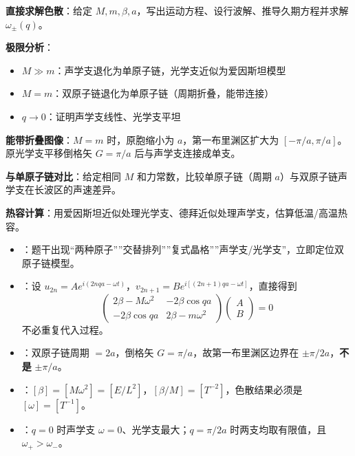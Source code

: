 \begin{drillbox}[训练点与考法变体]
 \textbf{直接求解色散}：给定 $M, m, \beta, a$，写出运动方程、设行波解、推导久期方程并求解 $\omega_{\pm}(q)$。

 \textbf{极限分析}：
\begin{itemize}[nosep]
    \item $M\gg m$：声学支退化为单原子链，光学支近似为爱因斯坦模型
    \item $M=m$：双原子链退化为单原子链（周期折叠，能带连接）
    \item $q\to0$：证明声学支线性、光学支平坦
\end{itemize}

 \textbf{能带折叠图像}：$M=m$ 时，原胞缩小为 $a$，第一布里渊区扩大为 $[-\pi/a, \pi/a]$。原光学支平移倒格矢 $G=\pi/a$ 后与声学支连接成单支。

 \textbf{与单原子链对比}：给定相同 $M$ 和力常数，比较单原子链（周期 $a$）与双原子链声学支在长波区的声速差异。

 \textbf{热容计算}：用爱因斯坦近似处理光学支、德拜近似处理声学支，估算低温/高温热容。
\end{drillbox}

\begin{tipbox}[快速识别与解题技巧]
\begin{itemize}
    \item {}：题干出现``两种原子''''交替排列''''复式晶格''''声学支/光学支''，立即定位双原子链模型。
    \item {}：设 $u_{2n}=Ae^{i(2nqa-\omega t)}$，$v_{2n+1}=Be^{i[(2n+1)qa-\omega t]}$，直接得到
    \[
    \begin{pmatrix}2\beta-M\omega^2 & -2\beta\cos qa\\ -2\beta\cos qa & 2\beta-m\omega^2\end{pmatrix}\begin{pmatrix}A\\ B\end{pmatrix}=0
    \]
    不必重复代入过程。
    \item {}：双原子链周期 $=2a$，倒格矢 $G=\pi/a$，故第一布里渊区边界在 $\pm\pi/2a$，\textbf{不是} $\pm\pi/a$。
    \item {}：$[\beta]=[M\omega^2]=[E/L^2]$，$[\beta/M]=[T^{-2}]$，色散结果必须是 $[\omega]=[T^{-1}]$。
    \item {}：$q=0$ 时声学支 $\omega=0$、光学支最大；$q=\pi/2a$ 时两支均取有限值，且 $\omega_{+}>\omega_{-}$。
\end{itemize}
\end{tipbox}

